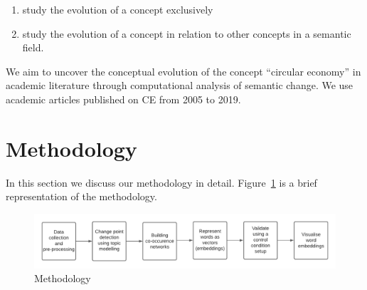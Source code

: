 \documentclass[output=paper]{langsci/langscibook}
\begin{document}
\begin{enumerate}[label=\alph*.]
\item study the evolution of a concept exclusively
\item study the evolution of a concept in relation to other concepts in a semantic field.
\end{enumerate}

We aim to uncover the conceptual evolution of the concept ``circular economy'' in academic literature through computational analysis of semantic change. We use academic articles published on CE from 2005 to 2019. 

\section{Methodology}\label{ch03:method}
In this section we discuss our methodology in detail. Figure~\ref{ch03:fig1} is a brief representation of the methodology.

\begin{figure}
\includegraphics[width=\textwidth]{figures/MAHANTY_Methodology.png}
\caption{Methodology}\label{ch03:fig1}
\end{figure}
\end{document}

